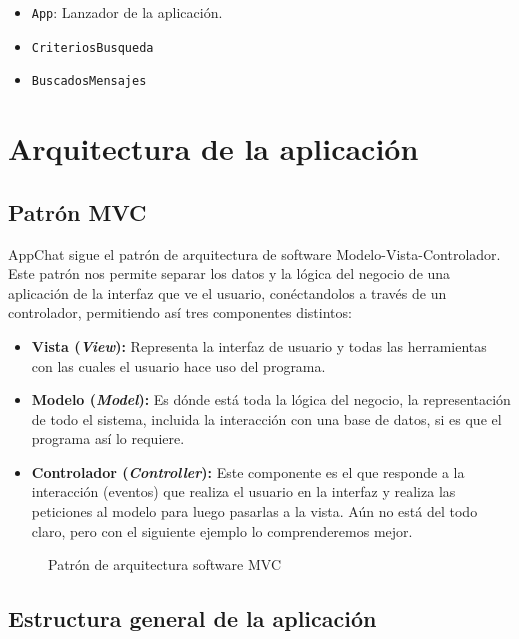\documentclass[11pt]{article}
\begin{document}
\begin{itemize}
	\item \texttt{App}: Lanzador de la aplicación.
	\item \texttt{CriteriosBusqueda}
	\item \texttt{BuscadosMensajes}
\end{itemize}

\clearpage

\section{Arquitectura de la aplicación}

\subsection{Patrón MVC}

AppChat sigue el patrón de arquitectura de software Modelo-Vista-Controlador. Este patrón nos permite separar los datos y la lógica del negocio de una aplicación de la interfaz que ve el usuario, conéctandolos a través de un controlador, permitiendo así tres componentes distintos:~\cite{mdnMVC}

\begin{itemize}
	\item \textbf{Vista (\textit{View}):} Representa la interfaz de usuario y todas las herramientas con las cuales el usuario hace uso del programa.
	
	\item \textbf{Modelo (\textit{Model}):} Es dónde está toda la lógica del negocio, la representación de todo el sistema, incluida la interacción con una base de datos, si es que el programa así lo requiere.
	
	\item \textbf{Controlador (\textit{Controller}):} Este componente es el que responde a la interacción (eventos) que realiza el usuario en la interfaz y realiza las peticiones al modelo para luego pasarlas a la vista. Aún no está del todo claro, pero con el siguiente ejemplo lo comprenderemos mejor.
\end{itemize}

\begin{figure}[H]
	\centering
	\scalebox{1.25}{
		
	}
	\caption{Patrón de arquitectura software MVC}
	\label{fig:mvc}
\end{figure}

\clearpage

\subsection{Estructura general de la aplicación}
\end{document}
